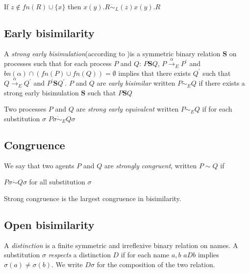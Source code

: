 \begin{example}
  If $z\notin fn(R)\cup \{x\}$ then $x(y).R \dot{\sim}_{L} (z)x(y).R$
\end{example}



\subsection{Early bisimilarity}

\begin{definition}
  A \emph{strong early bisimulation}(according to \cite{parrow})is a symmetric binary relation $\mathbf{S}$ on processes such that for each process $P$ and $Q$: $P\mathbf{S} Q$, $P \xrightarrow{\alpha}_{E} P^{'}$ and $bn(\alpha) \cap (fn(P) \cup fn(Q))=\emptyset$ implies that there exists $Q^{'}$ such that $Q \xrightarrow{\alpha}_{E} Q^{'}$ and $P^{'}\mathbf{S}Q^{'}$. $P$ and $Q$ are \emph{early bisimilar} written $P\dot{\sim}_{E}Q$ if there exists a strong early bisimulation $\mathbf{S}$ such that $P\mathbf{S}Q$
\end{definition}

\begin{definition}
  Two processes $P$ and $Q$ are \emph{strong early equivalent} written $P\sim_{E}Q$ if for each substitution $\sigma$ $P\sigma \dot{\sim}_{E}Q\sigma$
\end{definition}

\subsection{Congruence}

\begin{definition}
  We say that two agents $P$ and $Q$ are \emph{strongly congruent}, written $P\sim Q$ if
  \begin{center}
    $P\sigma \dot{\sim} Q\sigma$ for all substitution $\sigma$    
  \end{center}
\end{definition}

\begin{proposition}
  Strong congruence is the largest congruence in bisimilarity.
\end{proposition}


\subsection{Open bisimilarity}

\begin{definition}
  A \emph{distinction} is a finite symmetric and irreflexive binary relation on names. A substitution $\sigma$ \emph{respects} a distinction $D$ if for each name $a,b$ $aDb$ implies $\sigma(a)\neq \sigma(b)$. We write $D\sigma$ for the composition of the two relation.
\end{definition}


